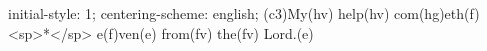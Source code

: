 initial-style: 1;
centering-scheme: english;
(c3)My(hv) help(hv) com(hg)eth(f) <sp>*</sp> e(f)ven(e) from(fv) the(fv) Lord.(e)
